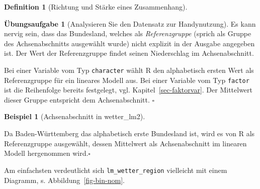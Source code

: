 \documentclass[
  a4paper,
  DIV=11]{scrreprt}
\theoremstyle{definition}
\newtheorem{exercise}{Übungsaufgabe}[chapter]
\theoremstyle{definition}
\newtheorem{example}{Beispiel}[chapter]
\theoremstyle{definition}
\newtheorem{definition}{Definition}[chapter]
\theoremstyle{remark}
\begin{document}
\begin{definition}[Richtung und Stärke eines
Zusammenhang]
\begin{exercise}[Analysieren Sie den Datensatz zur
Handynutzung]
Es kann nervig sein, dass das Bundesland, welches als
\emph{Referenzgruppe} (sprich als Gruppe des Achsenabschnitts ausgewählt
wurde) nicht explizit in der Ausgabe angegeben ist. Der Wert der
Referenzgruppe findet seinen Niederschlag im Achsenabschnitt.

\begin{tcolorbox}[enhanced jigsaw, leftrule=.75mm, opacitybacktitle=0.6, colback=white, colframe=quarto-callout-note-color-frame, coltitle=black, colbacktitle=quarto-callout-note-color!10!white, opacityback=0, left=2mm, breakable, titlerule=0mm, toptitle=1mm, bottomtitle=1mm, rightrule=.15mm, title=\textcolor{quarto-callout-note-color}{\faInfo}\hspace{0.5em}{Hinweis}, arc=.35mm, bottomrule=.15mm, toprule=.15mm]

Bei einer Variable vom Typ \texttt{character} wählt R den alphabetisch
ersten Wert als Referenzgruppe für ein lineares Modell aus. Bei einer
Variable vom Typ \texttt{factor} ist die Reihenfolge bereits festgelegt,
vgl. Kapitel~\ref{sec-faktorvar}. Der Mittelwert dieser Gruppe
entspricht dem Achsenabschnitt. \(\square\)

\end{tcolorbox}

\begin{example}[Achsenabschnitt in
wetter\_lm2]\protect\hypertarget{exm-bawü}{}\label{exm-bawü}

Da Baden-Württemberg das alphabetisch erste Bundesland ist, wird es von
R als Referenzgruppe ausgewählt, dessen Mittelwert als Achsenabschnitt
im linearen Modell hergenommen wird.\(\square\)

\end{example}

Am einfachsten verdeutlicht sich \texttt{lm\_wetter\_region} vielleicht
mit einem Diagramm, s. Abbildung~\ref{fig-bin-nom}.

\begin{figure}

\end{figure}
\end{exercise}
\end{definition}
\end{document}
